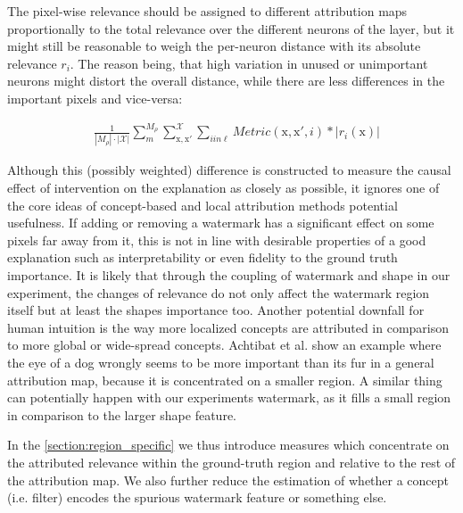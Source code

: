 The pixel-wise relevance should be assigned to different attribution maps proportionally to the total relevance over the different neurons of the layer, but it might still be reasonable to weigh the per-neuron distance with its absolute relevance $r_i$. The reason being, that high variation in unused or unimportant neurons might distort the overall distance, while there are less differences in the important pixels and vice-versa:

\begin{align}
& \frac{1}{|M_\rho|\cdot |\mathcal{X}| }\sum_{m}^{M_{\rho}} \sum_{\mathrm{x,x'}}^{\mathcal{X}} \sum_{i in \ell} 
Metric(\mathrm{x,x'}, i) * |r_i(\mathrm{x})|
\end{align}

Although this (possibly weighted) difference is constructed to measure the causal effect of intervention on the explanation as closely as possible, it ignores one of the core ideas of concept-based and local attribution methods potential usefulness. If adding or removing a watermark has a significant effect on some pixels far away from it, this is not in line with desirable properties of a good explanation such as interpretability or even fidelity to the ground truth importance. It is likely that through the coupling of watermark and shape in our experiment, the changes of relevance do not only affect the watermark region itself but at least the shapes importance too. 
Another potential downfall for human intuition is the way more localized concepts are attributed in comparison to more global or wide-spread concepts. Achtibat et al. \cite{Achtibat2022} show an example where the eye of a dog wrongly seems to be more important than its fur in a general attribution map, because it is concentrated on a smaller region. A similar thing can potentially happen with our experiments watermark, as it fills a small region in comparison to the larger shape feature. 

In the \cref{section:region_specific} we thus introduce measures which concentrate on the attributed relevance within the ground-truth region and relative to the rest of the attribution map.
We also further reduce the estimation of whether a concept (i.e. filter) encodes the spurious watermark feature or something else. 

